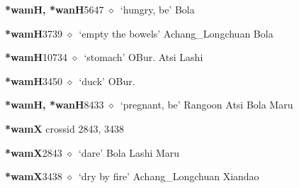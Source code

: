   \begin{list}{}{\leftmargin=1.5em \itemindent=-1.5em}
  \item {\footnotesize \textbf{*wamH, *wanH}}{\tiny 5647}
         $\diamond$~`hungry, be'
         Bola 
  \item {\footnotesize \textbf{*wamH}}{\tiny 3739}
\hspace{1ex}
         $\diamond$~`empty the bowels'
         Achang\_Longchuan 
\hspace{1ex}
         Bola 
  \item {\footnotesize \textbf{*wamH}}{\tiny 10734}
\hspace{1ex}
         $\diamond$~`stomach'
         OBur. 
\hspace{1ex}
         Atsi 
\hspace{1ex}
         Lashi 
  \item {\footnotesize \textbf{*wamH}}{\tiny 3450}
\hspace{1ex}
         $\diamond$~`duck'
         OBur. 
  \item {\footnotesize \textbf{*wamH, *wanH}}{\tiny 8433}
\hspace{1ex}
         $\diamond$~`pregnant, be'
         Rangoon 
\hspace{1ex}
         Atsi 
\hspace{1ex}
         Bola 
\hspace{1ex}
         Maru 
  \end{list}
\item
\textbf{*wamX}
  {\tiny crossid 2843, 3438}
  \begin{list}{}{\leftmargin=1.5em \itemindent=-1.5em}
  \item {\footnotesize \textbf{*wamX}}{\tiny 2843}
         $\diamond$~`dare'
         Bola 
\hspace{1ex}
         Lashi 
\hspace{1ex}
         Maru 
  \item {\footnotesize \textbf{*wamX}}{\tiny 3438}
\hspace{1ex}
         $\diamond$~`dry by fire'
         Achang\_Longchuan 
\hspace{1ex}
         Xiandao 
  \end{list}
